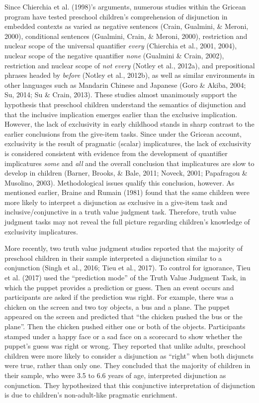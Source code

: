 \documentclass[
  english,
  ,man,floatsintext]{apa6}
\begin{document}
Since Chierchia et al. (1998)'s arguments, numerous studies within the Gricean program have tested preschool children's comprehension of disjunction in embedded contexts as varied as negative sentences (Crain, Gualmini, \& Meroni, 2000), conditional sentences (Gualmini, Crain, \& Meroni, 2000), restriction and nuclear scope of the universal quantifier \emph{every} (Chierchia et al., 2001, 2004), nuclear scope of the negative quantifier \emph{none} (Gualmini \& Crain, 2002), restriction and nuclear scope of \emph{not every} (Notley et al., 2012a), and prepositional phrases headed by \emph{before} (Notley et al., 2012b), as well as similar environments in other languages such as Mandarin Chinese and Japanese (Goro \& Akiba, 2004; Su, 2014; Su \& Crain, 2013). These studies almost unanimously support the hypothesis that preschool children understand the semantics of disjunction and that the inclusive implication emerges earlier than the exclusive implication. However, the lack of exclusivity in early childhood stands in sharp contrast to the earlier conclusions from the give-item tasks. Since under the Gricean account, exclusivity is the result of pragmatic (scalar) implicatures, the lack of exclusivity is considered consistent with evidence from the development of quantifier implicatures \emph{some} and \emph{all} and the overall conclusion that implicatures are slow to develop in children (Barner, Brooks, \& Bale, 2011; Noveck, 2001; Papafragou \& Musolino, 2003). Methodological issues qualify this conclusion, however. As mentioned earlier, Braine and Rumain (1981) found that the same children were more likely to interpret a disjunction as exclusive in a give-item task and inclusive/conjunctive in a truth value judgment task. Therefore, truth value judgment tasks may not reveal the full picture regarding children's knowledge of exclusivity implicatures.

More recently, two truth value judgment studies reported that the majority of preschool children in their sample interpreted a disjunction similar to a conjunction (Singh et al., 2016; Tieu et al., 2017). To control for ignorance, Tieu et al. (2017) used the \enquote{prediction mode} of the Truth Value Judgment Task, in which the puppet provides a prediction or guess. Then an event occurs and participants are asked if the prediction was right. For example, there was a chicken on the screen and two toy objects, a bus and a plane. The puppet appeared on the screen and predicted that \enquote{the chicken pushed the bus or the plane}. Then the chicken pushed either one or both of the objects. Participants stamped under a happy face or a sad face on a scorecard to show whether the puppet's guess was right or wrong. They reported that unlike adults, preschool children were more likely to consider a disjunction as \enquote{right} when both disjuncts were true, rather than only one. They concluded that the majority of children in their sample, who were 3.5 to 6.6 years of age, interpreted disjunction as conjunction. They hypothesized that this conjunctive interpretation of disjunction is due to children's non-adult-like pragmatic enrichment.
\end{document}
